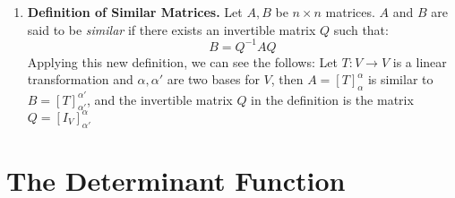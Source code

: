 \documentclass[oneside, 12pt]{book}
\newcommand{\settag}[1]{\renewcommand{\theenumi}{#1}}
\newcommand{\tbf}[1]{\textbf{#1}}
\newcommand{\trans}[3]{$#1:#2\rightarrow{}#3$}
\newcommand{\map}[3]{\text{$\left[#1\right]_{#2}^{#3}$}}
\newcommand{\para}[1]{\item \tbf{#1}}
\begin{document}
\begin{enumerate}
    \settag{2.7.6}
    \para{Definition of Similar Matrices.} Let $A, B$ be $n\times n$ matrices. $A$ and $B$ are said to be \textit{similar} if there exists an invertible matrix $Q$ such that:
    \begin{equation*}
        B = Q^{-1}AQ
    \end{equation*}
    Applying this new definition, we can see the follows: Let \trans{T}{V}{V} is a linear transformation and $\alpha, \alpha'$ are two bases for $V$, then $A = \map{T}{\alpha}{\alpha}$ is similar to $B = \map{T}{\alpha'}{\alpha'}$, and the invertible matrix $Q$ in the definition is the matrix $Q = \map{I_V}{\alpha'}{\alpha}$
\end{enumerate}

\chapter{The Determinant Function}
\end{document}
